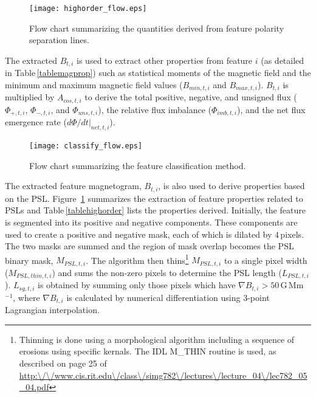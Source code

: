 \begin{figure}[!t]
\centerline{\texttt{[image: highorder\_flow.eps]}}
\caption[SMART characterisation method for PSLs.]{Flow chart summarizing the quantities derived from feature polarity separation lines.}\label{flow_highorder}
\end{figure}

The extracted $B_{t,i}$ is used to extract other properties from feature $i$ (as detailed in Table\,\ref{tablemagprop}) such as statistical moments of the magnetic field and the minimum and maximum magnetic field values ($B_{min,t,i}$ and $B_{max,t,i}$). $B_{t,i}$ is multiplied by $A_{cos,t,i}$ to derive the total positive, negative, and unsigned flux (${\Phi}_{+,t,i}$, ${\Phi}_{-,t,i}$, and ${\Phi}_{uns,t,i}$), the relative flux imbalance (${\Phi}_{imb,t,i}$), and the net flux emergence rate (${{d\Phi}/{dt}}|_{net,t,i}$).

\begin{figure}[!t]
\centerline{\texttt{[image: classify\_flow.eps]}}
\caption[The SMART classification method.]{Flow chart summarizing the feature classification method.}
\label{flow_class}
\end{figure}

The extracted feature magnetogram, $B_{t,i}$, is also used to derive properties based on the \gls{PSL}. Figure~\ref{flow_highorder} summarizes the extraction of feature properties related to \glspl{PSL} and Table\,\ref{tablehighorder} lists the properties derived. Initially, the feature is segmented into its positive and negative components. These components are used to create a positive and negative mask, each of which is dilated by $4$\,pixels. The two masks are summed and the region of mask overlap becomes the \gls{PSL} binary mask, $M_{PSL,t,i}$. The algorithm then thins\footnote{Thinning is done using a morphological algorithm including a sequence of erosions using specific kernals. The IDL M_THIN routine is used, as described on page 25 of \url{http:\/\/www.cis.rit.edu\/class\/simg782\/lectures\/lecture_04\/lec782\_05\_04.pdf}} $M_{PSL,t,i}$ to a single pixel width ($M_{PSL,thin,t,i}$) and sums the non-zero pixels to determine the \gls{PSL} length ($L_{PSL,t,i}$).  $L_{sg,t,i}$ is obtained by summing only those pixels which have $\nabla B_{t,i} > 50$\,G\,Mm$^{-1}$, where $\nabla B_{t,i}$ is calculated by numerical differentiation using 3-point Lagrangian interpolation. 

